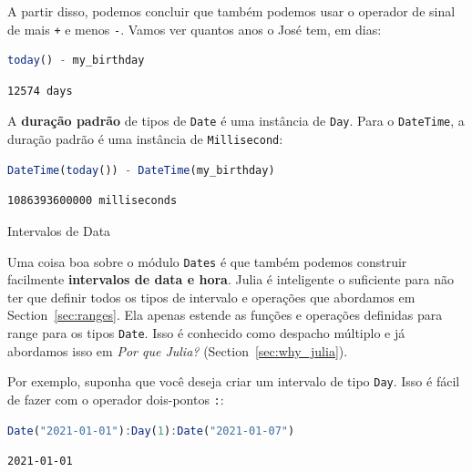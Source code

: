 \documentclass[
  notoc %
]{tufte-book}
\makeatletter
\newcommand{\passthrough}[1]{#1}
\renewcommand\subsubsection{%
\@startsection{subsubsection}{3}{\z@ }{-3.25ex\@plus -1ex \@minus -.2ex}{1.5ex \@plus .2ex}{\normalfont \normalsize \bfseries }
}
\makeatother
\begin{document}
A partir disso, podemos concluir que também podemos usar o operador de
sinal de mais \passthrough{\lstinline!+!} e menos
\passthrough{\lstinline!-!}. Vamos ver quantos anos o José tem, em dias:

\begin{lstlisting}[language=Julia]
today() - my_birthday
\end{lstlisting}

\begin{lstlisting}[language=Output]
12574 days
\end{lstlisting}

A \textbf{duração padrão} de tipos de \passthrough{\lstinline!Date!} é
uma instância de \passthrough{\lstinline!Day!}. Para o
\passthrough{\lstinline!DateTime!}, a duração padrão é uma instância de
\passthrough{\lstinline!Millisecond!}:

\begin{lstlisting}[language=Julia]
DateTime(today()) - DateTime(my_birthday)
\end{lstlisting}

\begin{lstlisting}[language=Output]
1086393600000 milliseconds
\end{lstlisting}

\hypertarget{sec:dates_intervals}{%
\subsubsection{Intervalos de Data}\label{sec:dates_intervals}}

Uma coisa boa sobre o módulo \passthrough{\lstinline!Dates!} é que
também podemos construir facilmente \textbf{intervalos de data e hora}.
Julia é inteligente o suficiente para não ter que definir todos os tipos
de intervalo e operações que abordamos em Section~\ref{sec:ranges}. Ela
apenas estende as funções e operações definidas para range para os tipos
\passthrough{\lstinline!Date!}. Isso é conhecido como despacho múltiplo
e já abordamos isso em \emph{Por que Julia?}
(Section~\ref{sec:why_julia}).

Por exemplo, suponha que você deseja criar um intervalo de tipo
\passthrough{\lstinline!Day!}. Isso é fácil de fazer com o operador
dois-pontos \passthrough{\lstinline!:!}:

\begin{lstlisting}[language=Julia]
Date("2021-01-01"):Day(1):Date("2021-01-07")
\end{lstlisting}

\begin{lstlisting}[language=Output]
2021-01-01
\end{lstlisting}
\end{document}
